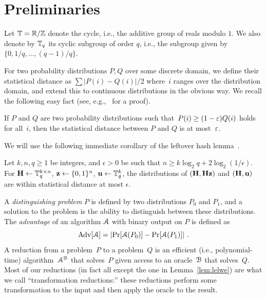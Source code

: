 \section{Preliminaries}
\label{sec:preliminaries}

Let $\mathbb{T} =
\mathbb{R}/\mathbb{Z}$ denote the cycle, i.e., the additive group of reals modulo
$1$. We also denote by $\mathbb{T}_q$ its cyclic subgroup of order $q$, i.e.,
the subgroup given by $\{0,1/q,\ldots,(q-1)/q\}$.

For two probability distributions $P,Q$ over some discrete domain, we
define their statistical distance as $\sum |P(i)-Q(i)|/2$ where~$i$
ranges over the distribution domain, and extend this to continuous
distributions in the obvious way. We recall the following easy fact
(see, e.g.,~\cite[Eq.~(2.3)]{AldousDiaconis87} for a proof).
\begin{claim}\label{clm:separationdist}
  If $P$ and $Q$ are two probability distributions such that~$P(i) \ge
  (1-\varepsilon)Q(i)$ holds for all~$i$, then the statistical distance
  between $P$ and $Q$ is at most~$\varepsilon$.
\end{claim}



We will use the following immediate corollary of the leftover hash
lemma~\cite{DBLP:journals/siamcomp/HastadILL99}.

\begin{lemma}
  \label{lem:lhl}
  Let $k, n, q \ge 1$ be integers, and $\epsilon > 0$ be such that $n
  \ge k \log_2 q + 2 \log_2 (1/\epsilon)$. For $\mathbf{{H}} \gets \mathbb{T}_q^{k \times
    n}$, $\mathbf{{z}} \gets \{0,1\}^n$, $\mathbf{{u}} \gets {\mathbb T}_q^k$, the
  distributions of $(\mathbf{{H}}, \mathbf{{H}}\mathbf{{z}})$ and $(\mathbf{{H}}, \mathbf{{u}})$ are
  within statistical distance at most $\epsilon$.
\end{lemma}


A \emph{distinguishing problem} $P$ is defined by two distributions $P_0$ and $P_1$, and a solution to the problem is the ability to distinguish between these distributions. The \emph{advantage} of an algorithm ${\cal A}$ with binary output on $P$ is defined as
\[
\mathrm{Adv}[{\cal A}] = \lvert\Pr[{\cal A}(P_0)] - \Pr[{\cal A}(P_1)]\rvert~.
\]
A reduction from a problem~$P$ to a problem~$Q$ is an efficient (i.e.,
polynomial-time) algorithm~${\cal A}^{{\cal B}}$ that solves~$P$ given
access to an oracle~${\cal B}$ that solves~$Q$. Most of our reductions
(in fact all except the one in Lemma~\ref{lem:lelwe}) are what we 
call ``transformation reductions:'' these reductions perform some transformation
to the input and then apply the oracle to the result. 


